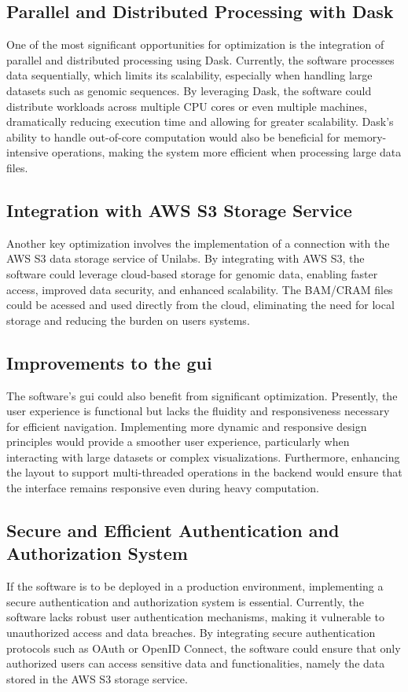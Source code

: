 \subsection{Parallel and Distributed Processing with Dask}
One of the most significant opportunities for optimization is the integration of parallel and distributed processing using Dask. Currently, the software processes data sequentially, which limits its scalability, especially when handling large datasets such as genomic sequences. By leveraging Dask, the software could distribute workloads across multiple CPU cores or even multiple machines, dramatically reducing execution time and allowing for greater scalability. Dask's ability to handle out-of-core computation would also be beneficial for memory-intensive operations, making the system more efficient when processing large data files.

\subsection{Integration with AWS S3 Storage Service}
Another key optimization involves the implementation of a connection with the AWS S3 data storage service of Unilabs. By integrating with AWS S3, the software could leverage cloud-based storage for genomic data, enabling faster access, improved data security, and enhanced scalability. The BAM/CRAM files could be acessed and used directly from the cloud, eliminating the need for local storage and reducing the burden on users systems. 

\subsection{Improvements to the \acl{gui}}
The software's \ac{gui} could also benefit from significant optimization. Presently, the user experience is functional but lacks the fluidity and responsiveness necessary for efficient navigation. Implementing more dynamic and responsive design principles would provide a smoother user experience, particularly when interacting with large datasets or complex visualizations. Furthermore, enhancing the layout to support multi-threaded operations in the backend would ensure that the interface remains responsive even during heavy computation.

\subsection{Secure and Efficient Authentication and Authorization System}
If the software is to be deployed in a production environment, implementing a secure authentication and authorization system is essential. Currently, the software lacks robust user authentication mechanisms, making it vulnerable to unauthorized access and data breaches. By integrating secure authentication protocols such as OAuth or OpenID Connect, the software could ensure that only authorized users can access sensitive data and functionalities, namely the data stored in the AWS S3 storage service.

